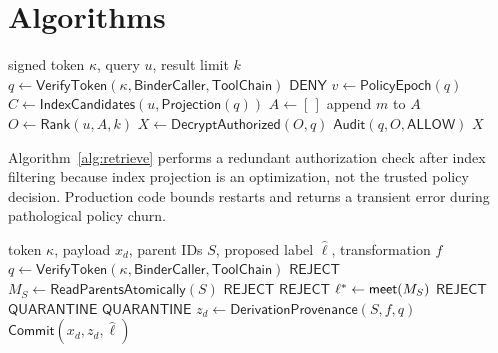 \section{Algorithms}
\label{sec:algorithm}

\begin{algorithm}[t]
\caption{MemScope retrieval}
\label{alg:retrieve}
\begin{algorithmic}[1]
\Require signed token $\kappa$, query $u$, result limit $k$
\State $q\gets\mathsf{VerifyToken}(\kappa,\mathsf{BinderCaller},\mathsf{ToolChain})$
 \State \Return $\mathsf{DENY}$ \EndIf
\State $v\gets\mathsf{PolicyEpoch}(q)$
\State $C\gets\mathsf{IndexCandidates}(u,\mathsf{Projection}(q))$
\State $A\gets[\,]$
    \State append $m$ to $A$
  \EndIf
\EndFor
\State $O\gets\mathsf{Rank}(u,A,k)$
  \State \Return {} 
\EndIf
\State $X\gets\mathsf{DecryptAuthorized}(O,q)$
\State $\mathsf{Audit}(q,O,\mathsf{ALLOW})$
\State \Return $X$
\end{algorithmic}
\end{algorithm}

Algorithm~\ref{alg:retrieve} performs a redundant authorization check after index filtering because index projection is an optimization, not the trusted policy decision. Production code bounds restarts and returns a transient error during pathological policy churn.

\begin{algorithm}[t]
\caption{MemScope derived-memory admission}
\label{alg:derive}
\begin{algorithmic}[1]
\Require token $\kappa$, payload $x_d$, parent IDs $S$, proposed label $\hat\ell$, transformation $f$
\State $q\gets\mathsf{VerifyToken}(\kappa,\mathsf{BinderCaller},\mathsf{ToolChain})$
 \State \Return $\mathsf{REJECT}$ \EndIf
\State $M_S\gets\mathsf{ReadParentsAtomically}(S)$
 \State \Return $\mathsf{REJECT}$ \EndIf
{}
   \State \Return $\mathsf{REJECT}$ \EndIf
\EndFor
\State $\ell^*\gets\mathsf{meet}(M_S)$
\If{$\neg(\hat\ell\preceq\ell^*)$} \State \Return $\mathsf{REJECT}$ \EndIf
{} \State \Return $\mathsf{QUARANTINE}$ \EndIf
{} \State \Return $\mathsf{QUARANTINE}$ \EndIf
\State $z_d\gets\mathsf{DerivationProvenance}(S,f,q)$
\State \Return $\mathsf{Commit}(x_d,z_d,\hat\ell)$
\end{algorithmic}
\end{algorithm}

